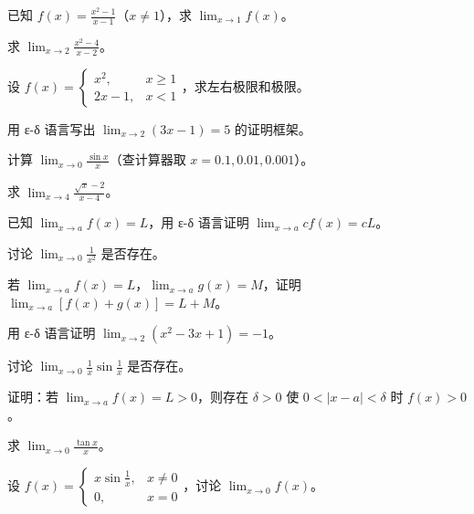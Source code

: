 \begin{exercise}[2]
已知 \(f(x)=\frac{x^2-1}{x-1}\)（\(x\neq1\)），求 \(\lim_{x\to 1} f(x)\)。
\end{exercise}
\begin{exercise}[2]
求 \(\displaystyle\lim_{x\to 2} \frac{x^2-4}{x-2}\)。
\end{exercise}
\begin{exercise}[2]
设 \(f(x)=\begin{cases}x^2,&x\ge1\\2x-1,&x<1\end{cases}\)，求左右极限和极限。
\end{exercise}
\begin{exercise}[2]
用 ε-δ 语言写出 \(\lim_{x\to 2} (3x-1)=5\) 的证明框架。
\end{exercise}

\begin{exercise}[3]
计算 \(\displaystyle\lim_{x\to 0} \frac{\sin x}{x}\)（查计算器取 \(x=0.1,0.01,0.001\)）。
\end{exercise}
\begin{exercise}[3]
求 \(\displaystyle\lim_{x\to 4} \frac{\sqrt{x}-2}{x-4}\)。
\end{exercise}
\begin{exercise}[3]
已知 \(\lim_{x\to a} f(x)=L\)，用 ε-δ 语言证明 \(\lim_{x\to a} cf(x)=cL\)。
\end{exercise}
\begin{exercise}[3]
讨论 \(\displaystyle\lim_{x\to 0} \frac{1}{x^2}\) 是否存在。
\end{exercise}
\begin{exercise}[3]
若 \(\lim_{x\to a} f(x)=L\)，\(\lim_{x\to a} g(x)=M\)，证明 \(\lim_{x\to a} [f(x)+g(x)]=L+M\)。
\end{exercise}

\begin{exercise}[4]
用 ε-δ 语言证明 \(\displaystyle\lim_{x\to 2} (x^2-3x+1)=-1\)。
\end{exercise}
\begin{exercise}[4]
讨论 \(\displaystyle\lim_{x\to 0} \frac{1}{x}\sin\frac{1}{x}\) 是否存在。
\end{exercise}
\begin{exercise}[4]
证明：若 \(\lim_{x\to a} f(x)=L>0\)，则存在 \(\delta>0\) 使 \(0<|x-a|<\delta\) 时 \(f(x)>0\)。
\end{exercise}
\begin{exercise}[4]
求 \(\displaystyle\lim_{x\to 0} \frac{\tan x}{x}\)。
\end{exercise}
\begin{exercise}[4]
设 \(f(x)=\begin{cases}x\sin\frac1x,&x\neq0\\0,&x=0\end{cases}\)，讨论 \(\lim_{x\to0} f(x)\)。
\end{exercise}

